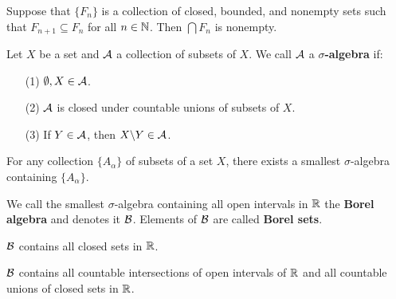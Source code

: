 \begin{theorem}\label{thm_3.18}
    Suppose that $\{F_n\}$ is a collection of closed, bounded, and nonempty sets
    such that $F_{n+1} \subseteq F_n$ for all $n \in \mathbb{N}$.  Then  $\bigcap{F_n}$
    is nonempty.
\end{theorem}

\begin{definition}
    Let $X$ be a set and  $\mathcal{A}$ a collection of subsets of  $X$. We call  $\mathcal{A}$
    a  \textbf{$\sigma$-algebra} if:
    \begin{enumerate}
        \item[(1)] $\emptyset, X \in \mathcal{A}$.

        \item[(2)] $\mathcal{A}$ is closed under countable unions of subsets of  $X$.

        \item[(3)] If $Y \in \mathcal{A}$, then  $X\backslash Y \in \mathcal{A}$.
    \end{enumerate}
\end{definition}
\begin{theorem}\label{thm_3.19}
     For any collection $\{A_\alpha\}$ of subsets of a set $X$, there exists a
     smallest  $\sigma$-algebra containing  $\{A_\alpha\}$.
\end{theorem}

\begin{definition}
    We call the smallest $\sigma$-algebra containing all open intervals in  $\mathbb{R}$
    the  \textbf{Borel algebra} and denotes it $\mathcal{B}$. Elements of  $\mathcal{B}$ are
    called  \textbf{Borel sets}.
\end{definition}

\begin{lemma}\label{lemma_3.20}
    $\mathcal{B}$ contains all closed sets in  $\mathbb{R}$.
\end{lemma}

\begin{lemma}\label{lemma_3.21}
    $\mathcal{B}$ contains all countable intersections of open intervals of  $\mathbb{R}$ and
    all countable unions of closed sets in  $\mathbb{R}$.
\end{lemma}
